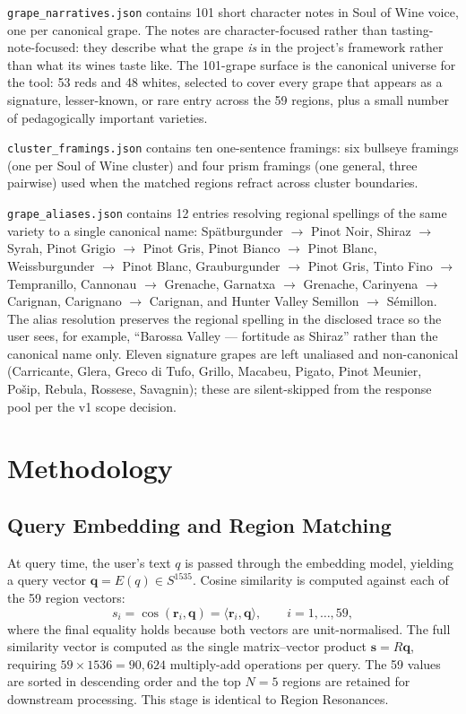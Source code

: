 \documentclass[11pt]{article}
\providecommand{\inner}[2]{\langle #1, #2 \rangle}
\begin{document}
\texttt{grape\_narratives.json} contains 101 short character notes in Soul of Wine voice, one per canonical grape. The notes are character-focused rather than tasting-note-focused: they describe what the grape \emph{is} in the project's framework rather than what its wines taste like. The 101-grape surface is the canonical universe for the tool: 53 reds and 48 whites, selected to cover every grape that appears as a signature, lesser-known, or rare entry across the 59 regions, plus a small number of pedagogically important varieties.

\texttt{cluster\_framings.json} contains ten one-sentence framings: six bullseye framings (one per Soul of Wine cluster) and four prism framings (one general, three pairwise) used when the matched regions refract across cluster boundaries.

\texttt{grape\_aliases.json} contains 12 entries resolving regional spellings of the same variety to a single canonical name: Spätburgunder $\rightarrow$ Pinot Noir, Shiraz $\rightarrow$ Syrah, Pinot Grigio $\rightarrow$ Pinot Gris, Pinot Bianco $\rightarrow$ Pinot Blanc, Weissburgunder $\rightarrow$ Pinot Blanc, Grauburgunder $\rightarrow$ Pinot Gris, Tinto Fino $\rightarrow$ Tempranillo, Cannonau $\rightarrow$ Grenache, Garnatxa $\rightarrow$ Grenache, Carinyena $\rightarrow$ Carignan, Carignano $\rightarrow$ Carignan, and Hunter Valley Semillon $\rightarrow$ Sémillon. The alias resolution preserves the regional spelling in the disclosed trace so the user sees, for example, ``Barossa Valley --- fortitude \textperiodcentered{} as Shiraz'' rather than the canonical name only. Eleven signature grapes are left unaliased and non-canonical (Carricante, Glera, Greco di Tufo, Grillo, Macabeu, Pigato, Pinot Meunier, Po\v{s}ip, Rebula, Rossese, Savagnin); these are silent-skipped from the response pool per the v1 scope decision.

\section{Methodology}

\subsection{Query Embedding and Region Matching}
At query time, the user's text $q$ is passed through the embedding model, yielding a query vector $\mathbf{q} = E(q) \in S^{1535}$. Cosine similarity is computed against each of the 59 region vectors:
\[
s_i = \cos(\mathbf{r}_i, \mathbf{q}) = \inner{\mathbf{r}_i}{\mathbf{q}}, \qquad i = 1, \ldots, 59,
\]
where the final equality holds because both vectors are unit-normalised. The full similarity vector is computed as the single matrix--vector product $\mathbf{s} = R \mathbf{q}$, requiring $59 \times 1536 = 90{,}624$ multiply-add operations per query. The 59 values are sorted in descending order and the top $N = 5$ regions are retained for downstream processing. This stage is identical to Region Resonances.
\end{document}

